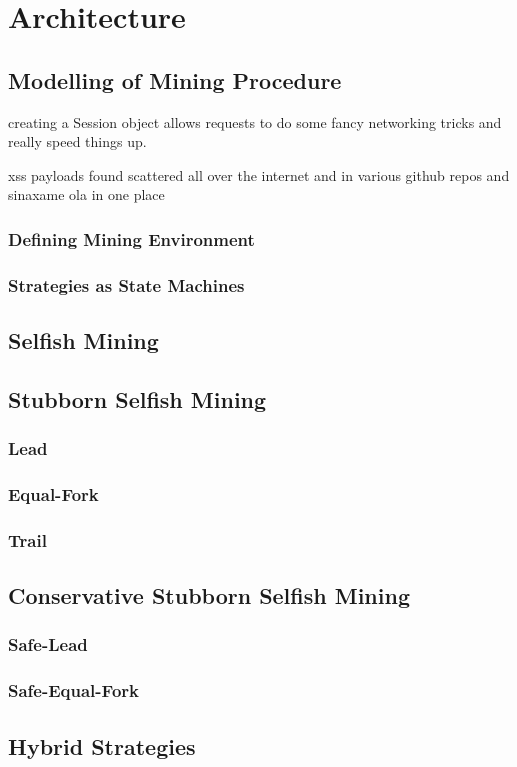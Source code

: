 \chapter{Architecture}
\label{sec:architecture}
\minitoc
\vspace*{1cm}

\section{Modelling of Mining Procedure}
creating a Session object allows requests to do some fancy networking tricks and really speed things up.

xss payloads found scattered all over the internet and in various github repos and sinaxame ola in one place

\subsection{Defining Mining Environment}

\subsection{Strategies as State Machines}

\section{Selfish Mining}

\section{Stubborn Selfish Mining}

\subsection{Lead}

\subsection{Equal-Fork}

\subsection{Trail}

\section{Conservative Stubborn Selfish Mining}

\subsection{Safe-Lead}

\subsection{Safe-Equal-Fork}

\section{Hybrid Strategies}